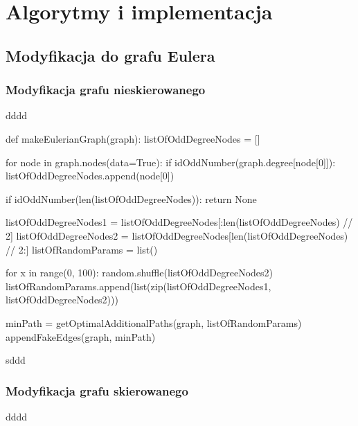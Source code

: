 \documentclass[a4paper, 12pt, twoside, openright]{article}
\begin{document}
\newpage
\section{Algorytmy i implementacja}

\subsection{Modyfikacja do grafu Eulera}
\subsubsection{Modyfikacja grafu nieskierowanego}
\indent\par
dddd
\begin{algorithm}[caption={\textit{makeEulerianGraph} przekształcający graf nieskierowany do grafu Eulera}, label={makeeulerianUG}]
def makeEulerianGraph(graph):
	listOfOddDegreeNodes = []
	
	for node in graph.nodes(data=True):
		if idOddNumber(graph.degree[node[0]]):
			listOfOddDegreeNodes.append(node[0])
	
	if idOddNumber(len(listOfOddDegreeNodes)):
		return None
	
	listOfOddDegreeNodes1 = listOfOddDegreeNodes[:len(listOfOddDegreeNodes) // 2]
	listOfOddDegreeNodes2 = listOfOddDegreeNodes[len(listOfOddDegreeNodes) // 2:]
	listOfRandomParams = list()
	
	for x in range(0, 100):
		random.shuffle(listOfOddDegreeNodes2)
		listOfRandomParams.append(list(zip(listOfOddDegreeNodes1, 
							listOfOddDegreeNodes2)))
							
	minPath = getOptimalAdditionalPaths(graph, listOfRandomParams)
	appendFakeEdges(graph, minPath)
\end{algorithm}
sddd
\subsubsection{Modyfikacja grafu skierowanego}
\indent\par
dddd
\end{document}
